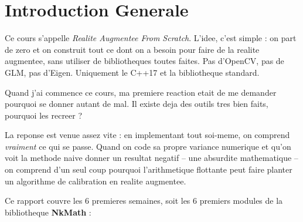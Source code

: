 \documentclass[12pt,a4paper]{report}
\newcommand{\NKM}{\textbf{\textcolor{PrimaryBlue}{NkMath}}}
\begin{document}
\chapter*{Introduction Generale}

\begin{conceptbox}
Ce cours s'appelle \textit{Realite Augmentee From Scratch}. L'idee, c'est simple : on part de zero et on construit tout ce dont on a besoin pour faire de la realite augmentee, sans utiliser de bibliotheques toutes faites. Pas d'OpenCV, pas de GLM, pas d'Eigen. Uniquement le C++17 et la bibliotheque standard.
\end{conceptbox}

\medskip

Quand j'ai commence ce cours, ma premiere reaction etait de me demander pourquoi se donner autant de mal. Il existe deja des outils tres bien faits, pourquoi les recreer ?

La reponse est venue assez vite : en implementant tout soi-meme, on comprend \textit{vraiment} ce qui se passe. Quand on code sa propre variance numerique et qu'on voit la methode naive donner un resultat negatif -- une absurdite mathematique -- on comprend d'un seul coup pourquoi l'arithmetique flottante peut faire planter un algorithme de calibration en realite augmentee.

\medskip

Ce rapport couvre les 6 premieres semaines, soit les 6 premiers modules de la bibliotheque \NKM{} :

\begin{center}
\end{center}
\end{document}
